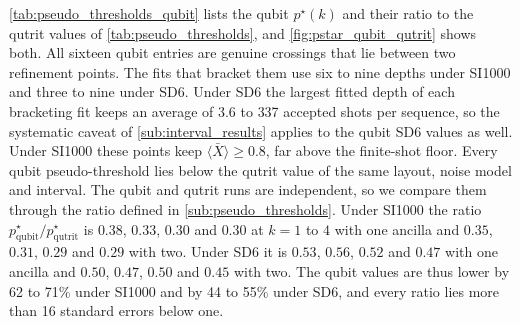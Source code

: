 \autoref{tab:pseudo_thresholds_qubit} lists the qubit $p^\star(k)$ and their ratio to the qutrit values of \autoref{tab:pseudo_thresholds}, and \autoref{fig:pstar_qubit_qutrit} shows both. All sixteen qubit entries are genuine crossings that lie between two refinement points. The fits that bracket them use six to nine depths under SI1000 and three to nine under SD6. Under SD6 the largest fitted depth of each bracketing fit keeps an average of 3.6 to 337 accepted shots per sequence, so the systematic caveat of \autoref{sub:interval_results} applies to the qubit SD6 values as well. Under SI1000 these points keep $\langle \bar X \rangle \ge 0.8$, far above the finite-shot floor. Every qubit pseudo-threshold lies below the qutrit value of the same layout, noise model and interval. The qubit and qutrit runs are independent, so we compare them through the ratio defined in \autoref{sub:pseudo_thresholds}. Under SI1000 the ratio $p^\star_{\mathrm{qubit}}/p^\star_{\mathrm{qutrit}}$ is $0.38$, $0.33$, $0.30$ and $0.30$ at $k = 1$ to $4$ with one ancilla and $0.35$, $0.31$, $0.29$ and $0.29$ with two. Under SD6 it is $0.53$, $0.56$, $0.52$ and $0.47$ with one ancilla and $0.50$, $0.47$, $0.50$ and $0.45$ with two. The qubit values are thus lower by 62 to 71\% under SI1000 and by 44 to 55\% under SD6, and every ratio lies more than 16 standard errors below one.

